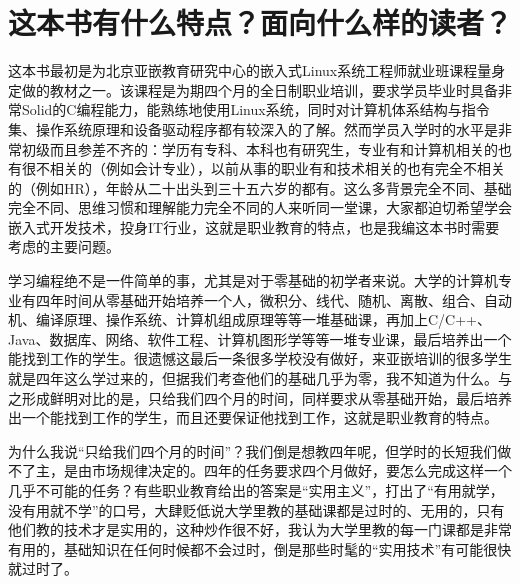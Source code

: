 

%
\section*{这本书有什么特点？面向什么样的读者？}
%


这本书最初是为北京亚嵌教育研究中心的嵌入式Linux系统工程师就业班课程量身定做的教材之一。该课程是为期四个月的全日制职业培训，要求学员毕业时具备非常Solid的C编程能力，能熟练地使用Linux系统，同时对计算机体系结构与指令集、操作系统原理和设备驱动程序都有较深入的了解。然而学员入学时的水平是非常初级而且参差不齐的：学历有专科、本科也有研究生，专业有和计算机相关的也有很不相关的（例如会计专业），以前从事的职业有和技术相关的也有完全不相关的（例如HR），年龄从二十出头到三十五六岁的都有。这么多背景完全不同、基础完全不同、思维习惯和理解能力完全不同的人来听同一堂课，大家都迫切希望学会嵌入式开发技术，投身IT行业，这就是职业教育的特点，也是我编这本书时需要考虑的主要问题。



学习编程绝不是一件简单的事，尤其是对于零基础的初学者来说。大学的计算机专业有四年时间从零基础开始培养一个人，微积分、线代、随机、离散、组合、自动机、编译原理、操作系统、计算机组成原理等等一堆基础课，再加上C/C++、Java、数据库、网络、软件工程、计算机图形学等等一堆专业课，最后培养出一个能找到工作的学生。很遗憾这最后一条很多学校没有做好，来亚嵌培训的很多学生就是四年这么学过来的，但据我们考查他们的基础几乎为零，我不知道为什么。与之形成鲜明对比的是，只给我们四个月的时间，同样要求从零基础开始，最后培养出一个能找到工作的学生，而且还要保证他找到工作，这就是职业教育的特点。



为什么我说“只给我们四个月的时间”？我们倒是想教四年呢，但学时的长短我们做不了主，是由市场规律决定的。四年的任务要求四个月做好，要怎么完成这样一个几乎不可能的任务？有些职业教育给出的答案是“实用主义”，打出了“有用就学，没有用就不学”的口号，大肆贬低说大学里教的基础课都是过时的、无用的，只有他们教的技术才是实用的，这种炒作很不好，我认为大学里教的每一门课都是非常有用的，基础知识在任何时候都不会过时，倒是那些时髦的“实用技术”有可能很快就过时了。



